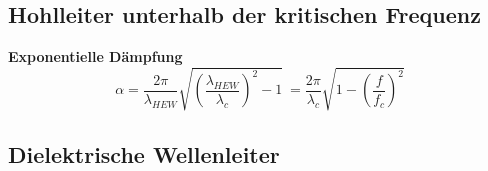 \subsection{Hohlleiter unterhalb der kritischen Frequenz}
\textbf{Exponentielle Dämpfung}
\[\alpha = \dfrac{2\pi}{\lambda_{HEW}} \sqrt{\left(\dfrac{\lambda_{HEW}}{\lambda_c}\right)^2 - 1}\
= \dfrac{2\pi}{\lambda_c} \sqrt{1 - \left(\frac{f}{f_c}\right)^2}\]
\subsection{Dielektrische Wellenleiter}

